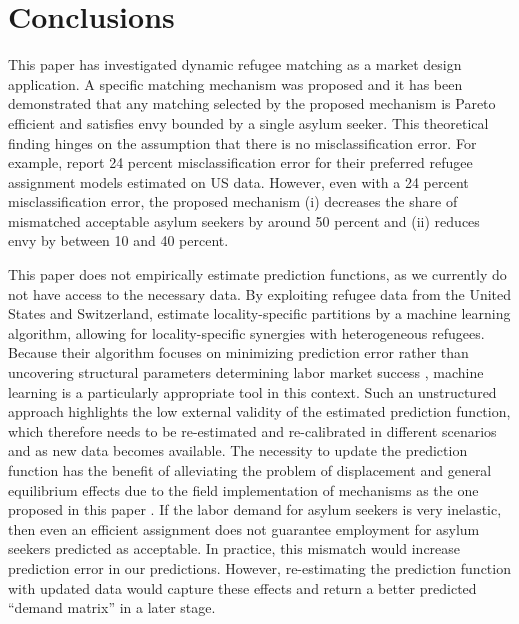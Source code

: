 \documentclass[12pt,fleqn]{article}
\begin{document}
\begin{table}[h!]
\caption{Simulation results for the conjecture that envy is bounded by one in acceptable and unacceptable asylum seekers.}
\label{TABLE:conjecture_1}
	\end{table}

\section{Conclusions}\label{SEC:conclusions}
This paper has investigated dynamic refugee matching as a market design application. A specific matching mechanism was proposed and it has been demonstrated that any matching selected by the proposed mechanism is Pareto efficient and satisfies envy bounded by a single asylum seeker. This theoretical finding hinges on the assumption that there is no misclassification error. For example, \cite{bib:BansakEtAl} report 24 percent misclassification error for their preferred refugee assignment models estimated on US data. However, even with a 24 percent misclassification error, the proposed mechanism (i) decreases the share of mismatched acceptable asylum seekers by around 50 percent and (ii) reduces envy by between 10 and 40 percent.

This paper does not empirically estimate prediction functions, as we currently do not have access to the necessary data. By exploiting refugee data from the United States and Switzerland, \cite{bib:BansakEtAl} estimate locality-specific partitions by a machine learning algorithm, allowing for locality-specific synergies with heterogeneous refugees. Because their algorithm focuses on minimizing prediction error rather than uncovering structural parameters determining labor market success \citep{bib:MullainathanSpiess}, machine learning is a particularly appropriate tool in this context. Such an unstructured approach highlights the low external validity of the estimated prediction function, which therefore needs to be re-estimated and re-calibrated in different scenarios and as new data becomes available. The necessity to update the prediction function has the benefit of alleviating the problem of displacement and general equilibrium effects due to the field implementation of mechanisms as the one proposed in this paper \citep{bib:CreponEtAl}. If the labor demand for asylum seekers is very inelastic, then even an efficient assignment does not guarantee employment for asylum seekers predicted as acceptable. In practice, this mismatch would increase prediction error in our predictions. However, re-estimating the prediction function with updated data would capture these effects and return a better predicted ``demand matrix'' in a later stage.
\end{document}
